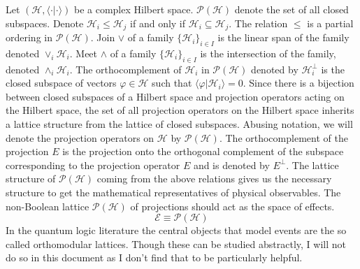 \documentclass[11pt]{report}
\begin{document}
			Let $(\mathcal{H},\langle \cdot|\cdot\rangle)$ be a complex Hilbert space. $\mathcal{P}(\mathcal{H})$ denote the set of all closed subspaces. Denote $\mathcal{H}_i\leq \mathcal{H}_j$ if and only if $\mathcal{H}_i \subseteq \mathcal{H}_j$. The relation $\leq $ is a partial ordering in $\mathcal{P}(\mathcal{H})$. Join $\vee$ of a family $\{\mathcal{H}_i\}_{i\in I}$ is the linear span of the family denoted $\vee_i \mathcal{H}_i$. Meet $\wedge$ of a family $\{\mathcal{H}_i\}_{i\in I}$ is the intersection of the family, denoted $\wedge_i \mathcal{H}_i$.  The orthocomplement of $\mathcal{H}_i$ in $\mathcal{P}(\mathcal{H})$ denoted by $\mathcal{H}_i^\perp$ is the closed subspace of vectors $\varphi\in\mathcal{H}$ such that $\langle\varphi|\mathcal{H}_i\rangle =0$. Since there is a bijection between closed subspaces of a Hilbert space and projection operators acting on the Hilbert space, the set of all projection operators on the Hilbert space inherits a lattice structure from the lattice of closed subspaces. Abusing notation, we will denote the projection operators on $\mathcal{H}$ by $\mathcal{P}(\mathcal{H})$. The orthocomplement of the projection $E$ is the projection onto the orthogonal complement of the subspace corresponding to the projection operator $E$ and is denoted by $E^\perp$. The lattice structure of $\mathcal{P}(\mathcal{H})$ coming from the above relations gives us the necessary structure to get the mathematical representatives of physical observables. The non-Boolean lattice $\mathcal{P}(\mathcal{H})$ of projections should act as the space of effects.
			$$\mathcal{E}
			\equiv \mathcal{P}(\mathcal{H})$$
			In the quantum logic literature the central objects that model events are the so called orthomodular lattices. Though these can be studied abstractly, I will not do so in this document as I don't find that to be particularly helpful.
			
\end{document}
